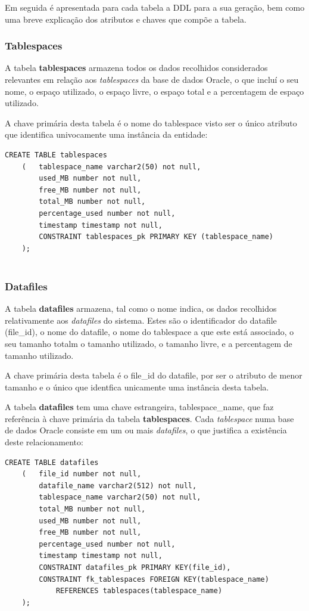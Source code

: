 Em seguida é apresentada para cada tabela a DDL para a sua geração, bem como uma breve explicação dos atributos e chaves que compõe a tabela.
\subsubsection*{Tablespaces}

A tabela \textbf{tablespaces} armazena todos os dados recolhidos considerados relevantes em relação aos \textit{tablespaces} da base de dados Oracle, o que incluí o seu nome, o espaço utilizado, o espaço livre, o espaço total e a percentagem de espaço utilizado.

A chave primária desta tabela é o nome do tablespace visto ser o único atributo que identifica univocamente uma instância da entidade:

\begin{verbatim}
CREATE TABLE tablespaces
    (   tablespace_name varchar2(50) not null,
        used_MB number not null,
        free_MB number not null,
        total_MB number not null,
        percentage_used number not null,
        timestamp timestamp not null,
        CONSTRAINT tablespaces_pk PRIMARY KEY (tablespace_name)
    );
    

\end{verbatim}
\subsubsection*{Datafiles}

A tabela \textbf{datafiles} armazena, tal como o nome indica, os dados recolhidos relativamente aos \textit{datafiles} do sistema. Estes são o identificador do datafile (file\_id), o nome do datafile, o nome do tablespace a que este está associado, o seu tamanho totalm o tamanho utilizado, o tamanho livre, e a percentagem de tamanho utilizado.

A chave primária desta tabela é o file\_id do datafile, por ser o atributo de menor tamanho e o único que identfica unicamente uma instância desta tabela.

 A tabela \textbf{datafiles} tem uma chave estrangeira, tablespace\_name, que faz referência à chave primária da tabela \textbf{tablespaces}. Cada \textit{tablespace} numa base de dados Oracle consiste em um ou mais \textit{datafiles}, o que justifica a existência deste relacionamento:



\begin{verbatim}
CREATE TABLE datafiles
    (   file_id number not null,
        datafile_name varchar2(512) not null,
        tablespace_name varchar2(50) not null,
        total_MB number not null,
        used_MB number not null,
        free_MB number not null,
        percentage_used number not null,
        timestamp timestamp not null,
        CONSTRAINT datafiles_pk PRIMARY KEY(file_id),
        CONSTRAINT fk_tablespaces FOREIGN KEY(tablespace_name)
            REFERENCES tablespaces(tablespace_name)
    );
\end{verbatim}
